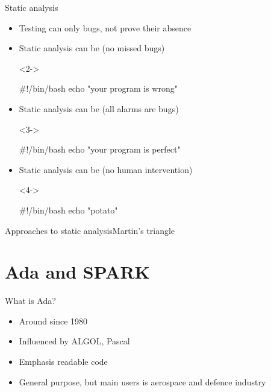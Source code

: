 \documentclass{beamer}
\begin{document}
\begin{frame}[fragile]{Static analysis}
  \begin{itemize}
  \item Testing can only  bugs, not prove their absence
  \item Static analysis can be  (no missed bugs)
    \begin{onlyenv}<2->
      \begin{pxcode}[language=bash,gobble=8,showstringspaces=false]
        #!/bin/bash
        echo "your program is wrong"
      \end{pxcode}
    \end{onlyenv}
  \item Static analysis can be  (all alarms are bugs)
    \begin{onlyenv}<3->
      \begin{pxcode}[language=bash,gobble=8,showstringspaces=false]
        #!/bin/bash
        echo "your program is perfect"
      \end{pxcode}
    \end{onlyenv}
  \item Static analysis can be  (no human intervention)
    \begin{onlyenv}<4->
      \begin{pxcode}[language=bash,gobble=8,showstringspaces=false]
        #!/bin/bash
        echo "potato"
      \end{pxcode}
    \end{onlyenv}
  \end{itemize}
\end{frame}

\begin{frame}{Approaches to static analysis}{Martin's triangle}
  \begin{center}
    \vskip -0.75cm
    
  \end{center}
\end{frame}

\section{Ada and SPARK}
\begin{frame}{What is Ada?}
  \begin{itemize}
  \item Around since 1980
  \item Influenced by ALGOL, Pascal
  \item Emphasis readable code
  \item General purpose, but main users is aerospace and defence
    industry
  \end{itemize}
\end{frame}
\end{document}
